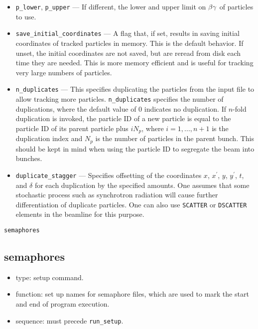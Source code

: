 \documentclass[11pt]{article}
\begin{document}
\begin{itemize}
\item \verb|p_lower|, \verb|p_upper| --- If different, the lower and upper limit on ${\rm \beta\gamma}$ of particles to use.
\item \verb|save_initial_coordinates| --- A flag that, if set, results in saving initial coordinates
of tracked particles in memory.  This is the default behavior.  If unset, the initial coordinates
are not saved, but are reread from disk each time they are needed.  This is more memory efficient
and is useful for tracking very large numbers of particles.
\item \verb|n_duplicates| --- This specifies duplicating the particles from the input file to allow tracking more
  particles.   \verb|n_duplicates| specifies the number of duplications, where the default value of 0 indicates no duplication.
  If $n$-fold duplication is invoked, the particle ID of a new particle is equal to the particle ID of its parent particle plus
  $i N_p$, where $i=1,...,n+1$ is the duplication index and $N_p$ is the number of particles in the parent bunch.
  This should be kept in mind when using the particle ID to segregate the beam into bunches.
\item \verb|duplicate_stagger| --- Specifies offsetting of the coordinates $x$, $x^\prime$, $y$, $y^\prime$, $t$, and $\delta$
  for each duplication by the specified amounts.
  One assumes that some stochastic process such as synchrotron radiation will cause further differentiation of duplicate particles.
  One can also use \verb|SCATTER| or \verb|DSCATTER| elements in the beamline for this purpose.
\end{itemize}

\newpage
\begin{center}{\Large\verb|semaphores|}\end{center}
\subsection{semaphores \label{subsec:semaphores}}

\begin{itemize}
\item type: setup command.
\item function: set up names for semaphore files, which are used to mark the
        start and end of program execution.
\item sequence: must precede \verb|run_setup|.
\end{itemize}
\end{document}

